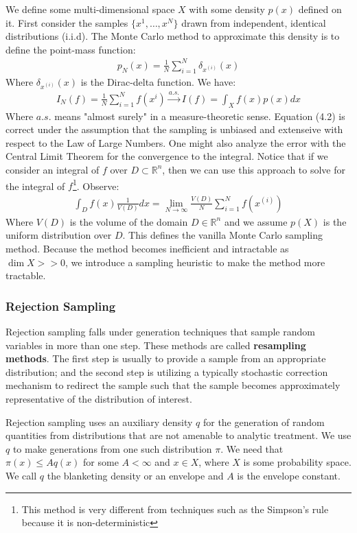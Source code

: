 \documentclass[paper=a4, fontsize=12pt]{scrartcl} %
\numberwithin{equation}{section} %
\numberwithin{figure}{section} %
\numberwithin{table}{section} %
\begin{document}
We define some multi-dimensional space $X$ with some density $p(x)$ defined on it. First consider the samples $\{x^1, \ldots, x^N\}$ drawn from independent, 
identical distributions (i.i.d). The Monte Carlo method to approximate this density is to define the point-mass function:
\begin{align}
    p_N(x)=\frac{1}{N}\sum_{i=1}^{N}\delta_{x^{(i)}}(x)
\end{align}
Where $\delta_{x^{(i)}}(x)$ is the Dirac-delta function. We have:
\begin{align}
    I_N(f)=\frac{1}{N}\sum_{i=1}^{N}f(x^{i}) \xrightarrow{a.s.} I(f) = \int_X f(x)p(x)dx
\end{align}
Where $a.s.$ means "almost surely" in a measure-theoretic sense. Equation (4.2) is correct under the assumption that the sampling is unbiased and extenseive with respect to the Law of Large Numbers.
One might also analyze the error with the Central Limit Theorem for the convergence to the integral.
Notice that if we consider an integral of $f$ over $D \subset \mathbb{R}^n$, then we can use this approach to solve for the 
integral of $f$\footnote{This method is very different from techniques such as the Simpson's rule because it is non-deterministic}. Observe:
\begin{align*}
    \int_D f(x) \frac{1}{V(D)} dx = \lim_{N \rightarrow \infty} \frac{V(D)}{N} \sum_{i=1}^{N} f(x^{(i)})
\end{align*}
Where $V(D)$ is the volume of the domain $D \in \mathbb{R}^n$ and we assume $p(X)$ is the uniform distribution over $D$. This defines the vanilla Monte Carlo sampling method. Because the method becomes 
inefficient and intractable as $\dim X >> 0$, we introduce a sampling heuristic to make the method more tractable.

\subsubsection{Rejection Sampling}
Rejection sampling falls under generation techniques that sample random variables in more than one step. These methods are called \textbf{resampling methods}. The 
first step is usually to provide a sample from an appropriate distribution; and the second step is utilizing a typically stochastic correction mechanism to redirect the sample such that the 
sample becomes approximately representative of the distribution of interest.

Rejection sampling uses an auxiliary density $q$ for the generation of random quantities from distributions that are not 
amenable to analytic treatment. We use $q$ to make generations from one such distribution $\pi$. We need that $\pi(x) \le Aq(x)$ for 
some $A < \infty$ and $x \in X$, where $X$ is some probability space. We call $q$ the blanketing density or an envelope and $A$ is the 
envelope constant.
\end{document}
